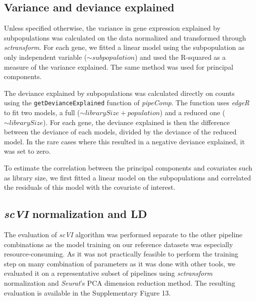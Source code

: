 \documentclass{bmcart}
\begin{document}
\subsection*{Variance and deviance explained}

Unless specified otherwise, the variance in gene expression explained by subpopulations was calculated on the data normalized and transformed through \textit{sctransform}. For each gene, we fitted a linear model using the subpopulation as only independent variable ($\sim subpopulation$) and used the R-squared as a measure of the variance explained. The same method was used for principal components.

The deviance explained by subpopulations was calculated directly on counts using the \linebreak \texttt{getDevianceExplained} function of \textit{pipeComp}. The function uses \textit{edgeR} to fit two models, a full ($\sim librarySize + population$) and a reduced one ($\sim librarySize$). For each gene, the deviance explained is then the difference between the deviance of each models, divided by the deviance of the reduced model. In the rare cases where this resulted in a negative deviance explained, it was set to zero.

To estimate the correlation between the principal components and covariates such as library size, we first fitted a linear model on the subpopulations and correlated the residuals of this model with the covariate of interest.

\subsection*{\textit{scVI} normalization and LD}

The evaluation of \textit{scVI} algorithm was performed separate to the other pipeline combinations as the model training on our reference datasets was especially resource-consuming. As it was not practically feasible to perform the training step on many combination of parameters as it was done with other tools, we evaluated it on a representative subset of pipelines using \textit{sctransform} normalization and \textit{Seurat}'s PCA dimension reduction method. The resulting evaluation is available in the Supplementary Figure 13. 
\end{document}
